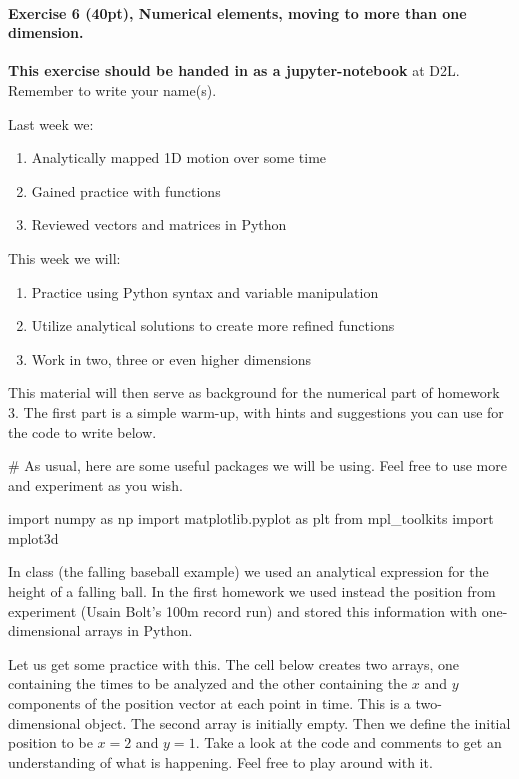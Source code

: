 \documentclass[%
oneside,                 %
final,                   %
10pt]{article}
\begin{document}
\paragraph{Exercise 6 (40pt), Numerical elements, moving to more than one dimension.}
\textbf{This exercise should be handed in as a jupyter-notebook} at D2L. Remember to write your name(s). 

Last week we:
\begin{enumerate}
\item Analytically mapped 1D motion over some time

\item Gained practice with functions

\item Reviewed vectors and matrices in Python
\end{enumerate}

\noindent
This week we will:
\begin{enumerate}
\item Practice using Python syntax and variable manipulation

\item Utilize analytical solutions to create more refined functions

\item Work in two, three or even higher dimensions
\end{enumerate}

\noindent
This material will then serve as background for the numerical part of homework 3. The first part is a simple warm-up, with hints and suggestions you can use for the code to write below. 








\bpycod
# As usual, here are some useful packages we will be using. Feel free to use more and experiment as you wish.

import numpy as np
import matplotlib.pyplot as plt
from mpl_toolkits import mplot3d

\epycod


In class (the falling baseball example) we used an  analytical expression for the height of a falling ball.
In the first homework we used instead the position from experiment (Usain Bolt's 100m record run) and stored this
information with one-dimensional arrays in Python.

Let us get some practice with this. The cell below creates two arrays,
one containing the times to be analyzed and the other containing the $x$
and $y$ components of the position vector at each point in time.  This is a two-dimensional object. The
second array is initially empty. Then we define  the initial
position to be $x=2$ and $y=1$. Take a look at the code and comments
to get an understanding of what is happening. Feel free to play around with it.
\end{document}
